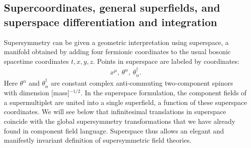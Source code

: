 \documentclass[12pt]{article}
\def\beq{\begin{eqnarray}}
\def\eeq{\end{eqnarray}}
\begin{document}
\subsection{Supercoordinates, general superfields, and 
superspace differentiation and integration\label{subsec:supercoordinates}}
\setcounter{footnote}{2}
\setcounter{equation}{0}

Supersymmetry can be given a geometric interpretation using superspace,
a manifold obtained by adding four fermionic coordinates to the usual bosonic spacetime coordinates
$t,x,y,z$. Points in superspace are labeled by coordinates:
\beq
x^\mu,\> \theta^\alpha,\> \theta^\dagger_{\dot\alpha}.
\label{eq:supercoordinates}
\eeq
Here $\theta^\alpha$ and $\theta^\dagger_{\dot\alpha}$ 
are constant complex anti-commuting two-component spinors with dimension
[mass]$^{-1/2}$. In the superspace formulation, the component fields of 
a supermultiplet
are united into a single superfield, a function of these superspace coordinates. 
We will see below that infinitesimal translations in superspace coincide with the 
global supersymmetry transformations that we have already found in component field language. Superspace thus allows an elegant and 
manifestly invariant definition of supersymmetric field theories.
\end{document}
